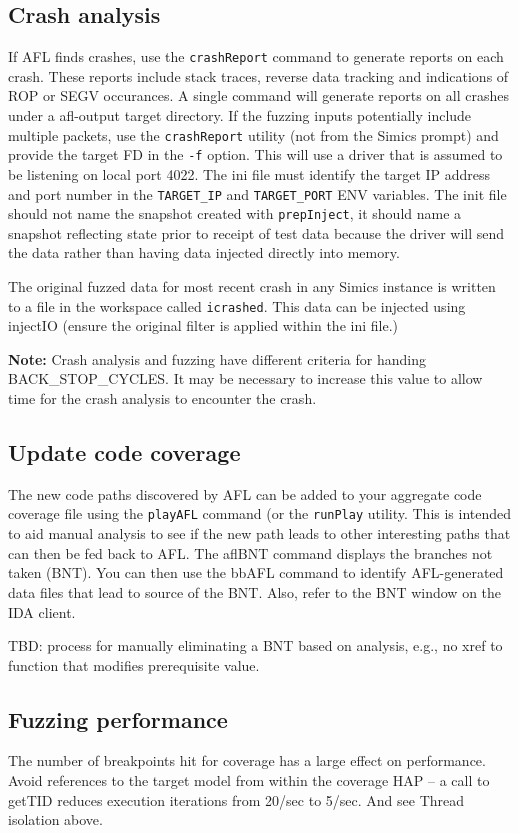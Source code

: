 \documentclass[titlepage]{article}
\begin{document}
\subsection{Crash analysis}
If AFL finds crashes, use the {\tt crashReport} command to generate reports on each crash.  These reports include stack traces, reverse
data tracking and indications of ROP or SEGV occurances.  A single command will generate reports on all crashes under a afl-output target
directory.  If the fuzzing inputs potentially include multiple packets, use the {\tt crashReport} utility (not from the Simics prompt) and provide
the target FD in the {\tt -f} option.  This will use a driver that is assumed to be listening on local port 4022.  The ini file must identify the target IP
address and port number in the {\tt TARGET\_IP} and {\tt TARGET\_PORT} ENV variables.  The init file should not name the snapshot created with {\tt prepInject},
it should name a snapshot reflecting state prior to receipt of test data because the driver will send the data rather than having data injected directly into 
memory.

The original fuzzed data for most recent crash in any Simics instance is written to a file in the workspace called {\tt icrashed}.  This data can be injected using
injectIO (ensure the original filter is applied within the ini file.)

\textbf{Note:} Crash analysis and fuzzing have different criteria for handing BACK\_STOP\_CYCLES.  It may be necessary to increase this 
value to allow time for the crash analysis to encounter the crash.


\subsection{Update code coverage}
The new code paths discovered by AFL can be added to your aggregate code coverage file using the {\tt playAFL} command (or the {\tt runPlay} utility.  This is intended
to aid manual analysis to see if the new path leads to other interesting paths that can then be fed back to AFL.  
The  aflBNT command displays the branches not taken (BNT).  You can then use the bbAFL command to identify AFL-generated data files
that lead to source of the BNT.  Also, refer to the BNT window on
the IDA client.

TBD: process for manually eliminating a BNT based on analysis, e.g., no xref to function that modifies prerequisite value.

\subsection{Fuzzing performance}
The number of breakpoints hit for coverage has a large effect on performance.
Avoid references to the target model from within the coverage HAP -- a call to getTID reduces execution iterations from 20/sec to 5/sec.
And see Thread isolation above.
\end{document}
